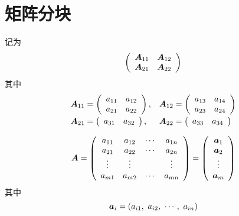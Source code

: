 \section{矩阵分块}

\begin{figure}[htbp]
  \centering
\end{figure}
记为
$$
\left(
  \begin{array}{cc}
    \boldsymbol{A}_{11} &  \boldsymbol{A}_{12}\\
    \boldsymbol{A}_{21} &  \boldsymbol{A}_{22}
  \end{array}
\right)
$$
其中
$$
\begin{array}{ll}
  \boldsymbol{A}_{11} = 
  \left(
  \begin{array}{cc}
    a_{11} &  a_{12}\\
    a_{21} &  a_{22}
  \end{array} \right),
           &
             \boldsymbol{A}_{12} = 
             \left(
             \begin{array}{cc}
               a_{13} &  a_{14}\\
               a_{23} &  a_{24}
             \end{array}
                        \right)\\ [0.3cm]
  \boldsymbol{A}_{21} = 
  \left(
  \begin{array}{cc}
    a_{31} &  a_{32}
  \end{array}\right) ,
           &
             \boldsymbol{A}_{22} = 
             \left(
             \begin{array}{cc}
               a_{33} &  a_{34}
             \end{array}
                        \right)    
\end{array}
$$

\begin{dingyi}[矩阵的按行分块]
  $$
  \boldsymbol{A} = \left(
    \begin{array}{cccc}
      a_{11} & a_{12} & \cdots & a_{1n}\\
      a_{21} & a_{22} & \cdots & a_{2n}\\
      \vdots & \vdots & & \vdots \\
      a_{m1} & a_{m2} & \cdots & a_{mn}
    \end{array}
  \right)
  = \left(
    \begin{array}{c}
      {\boldsymbol{a}}_1\\
      {\boldsymbol{a}}_2\\
      \vdots \\
      {\boldsymbol{a}}_m
    \end{array}
  \right)
  $$
  其中
  $$
  {\boldsymbol{a}}_i = (a_{i1}, ~a_{i2}, ~\cdots, ~a_{in})
  $$
\end{dingyi}

